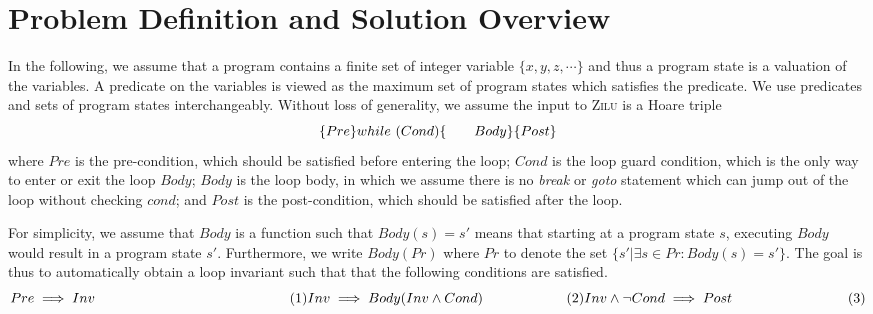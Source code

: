 
\section{Problem Definition and Solution Overview}
In the following, we assume that a program contains a finite set of integer variable $\{x,y,z,\cdots\}$ 
and thus a program state is a valuation of the variables. 
A predicate on the variables is viewed as the maximum set of program states which satisfies the predicate. 
We use predicates and sets of program states interchangeably. 
Without loss of generality, we assume the input to \textsc{Zilu} is a Hoare triple
\[
\{Pre\} \\
while~(Cond) \{ \\
~~~~~~Body \\
\} \\
\{Post\}
\]
where $Pre$ is the pre-condition, which should be satisfied before entering the loop; 
$Cond$ is the loop guard condition, which is the only way to enter or exit the loop $Body$; 
$Body$ is the loop body, in which we assume there is no \emph{break} or \emph{goto} statement which can jump out of the loop without checking $cond$; 
and $Post$ is the post-condition, which should be satisfied after the loop. 

For simplicity, we assume that $Body$ is a function such that $Body(s) = s'$ means 
that starting at a program state $s$, executing $Body$ would result in a program state $s'$. 
Furthermore, we write $Body(Pr)$ where $Pr$ to denote the set $\{s' | \exists s \in Pr: Body(s) = s'\}$. 
The goal is thus to automatically obtain a loop invariant such that that the following conditions are satisfied.
\[
Pre \implies Inv ~~~~~~~~~~~~~~~~~~~~~~~~~~~~~~~~~~~~~~~~~~(1) \\
Inv \implies Body(Inv \land Cond) ~~~~~~~~~~~~~~~~~~ (2) \\
Inv \land \neg Cond \implies Post ~~~~~~~~~~~~~~~~~~~~~~~~~ (3)
\]

